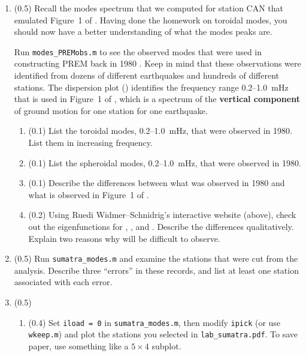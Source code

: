 \documentclass[11pt,titlepage,fleqn]{article}
\begin{document}
\begin{enumerate}
\item (0.5) Recall the modes spectrum that we computed for station CAN that emulated Figure~1 of \citet{Park2005}. Having done the homework on toroidal modes, you should now have a better understanding of what the modes peaks are.

Run \verb+modes_PREMobs.m+ to see the observed modes that were used in constructing PREM back in 1980 \citep{PREM}. Keep in mind that these observations were identified from dozens of different earthquakes and hundreds of different stations.
The dispersion plot () identifies the frequency range 0.2--1.0~mHz that is used in Figure~1 of \citet{Park2005}, which is a spectrum of the {\bf vertical component} of ground motion for one station for one earthquake.
%
\begin{enumerate}
\item (0.1) List the toroidal modes, 0.2--1.0~mHz, that were observed in 1980. \\
List them in increasing frequency.
\item (0.1) List the spheroidal modes, 0.2--1.0~mHz, that were observed in 1980.
\item (0.1) Describe the differences between what was observed in 1980 and what is observed in Figure~1 of \citet{Park2005}.
\item (0.2) Using Ruedi Widmer--Schnidrig's interactive website (above), check out the eigenfunctions for , , and . Describe the differences qualitatively. Explain two reasons why  will be difficult to observe.
\end{enumerate}


\item (0.5) Run \verb+sumatra_modes.m+ and examine the stations that were cut from the analysis. Describe three ``errors'' in these records, and list at least one station associated with each error.


\item (0.5)
%
\begin{enumerate}
\item (0.4) Set \verb+iload = 0+ in \verb+sumatra_modes.m+, then modify \verb+ipick+ (or use \verb+wkeep.m+) and plot the stations you selected in \verb+lab_sumatra.pdf+. To save paper, use something like a $5 \times 4$ subplot.


\end{enumerate}
\end{enumerate}
\end{document}
